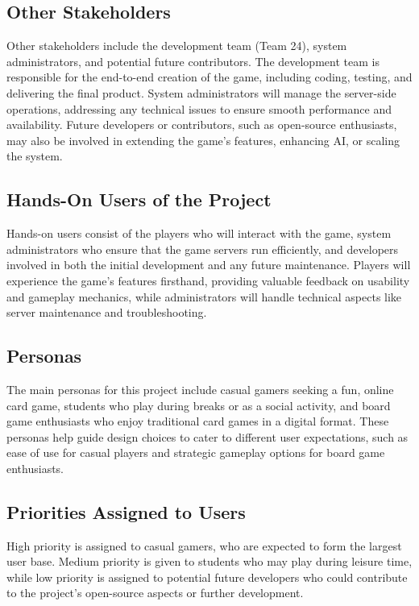 \documentclass{article}
\begin{document}
\subsection{Other Stakeholders}
Other stakeholders include the development team (Team 24), system administrators, and potential future contributors. The development team is responsible for the end-to-end creation of the game, including coding, testing, and delivering the final product. System administrators will manage the server-side operations, addressing any technical issues to ensure smooth performance and availability. Future developers or contributors, such as open-source enthusiasts, may also be involved in extending the game’s features, enhancing AI, or scaling the system.

\subsection{Hands-On Users of the Project}
Hands-on users consist of the players who will interact with the game, system administrators who ensure that the game servers run efficiently, and developers involved in both the initial development and any future maintenance. Players will experience the game's features firsthand, providing valuable feedback on usability and gameplay mechanics, while administrators will handle technical aspects like server maintenance and troubleshooting.

\subsection{Personas}
The main personas for this project include casual gamers seeking a fun, online card game, students who play during breaks or as a social activity, and board game enthusiasts who enjoy traditional card games in a digital format. These personas help guide design choices to cater to different user expectations, such as ease of use for casual players and strategic gameplay options for board game enthusiasts.

\subsection{Priorities Assigned to Users}
High priority is assigned to casual gamers, who are expected to form the largest user base. Medium priority is given to students who may play during leisure time, while low priority is assigned to potential future developers who could contribute to the project’s open-source aspects or further development.
\end{document}

